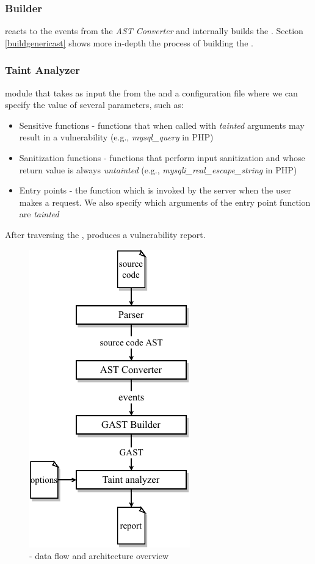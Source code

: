 \subsubsection{\astname{} Builder} reacts to the events from the \textit{AST Converter} and internally builds the \astname{}. Section \ref{buildgenericast} shows more in-depth the process of building the \astname{}. 

\subsubsection{Taint Analyzer} module that takes as input the \astname{} from the \astbuilder{} and a configuration file where we can specify the value of several parameters, such as:
\begin{itemize}
    \item Sensitive functions - functions that when called with \textit{tainted} arguments may result in a vulnerability (e.g., \textit{mysql\_query} in PHP)
    \item Sanitization functions - functions that perform input sanitization and whose return value is always \textit{untainted} (e.g., \textit{mysqli\_real\_escape\_string} in PHP)
    \item Entry points - the function which is invoked by the server when the user makes a request. We also specify which arguments of the entry point function are \textit{tainted}
\end{itemize}

After traversing the \astname{}, \toolname{} produces a vulnerability report. 

\begin{figure}[h]
    \centering
    \includegraphics[width =0.5\linewidth]{images/yasat-architecture.pdf}
    \caption{\toolname{} - data flow and architecture overview} 
    \label{architecture}
\end{figure}

